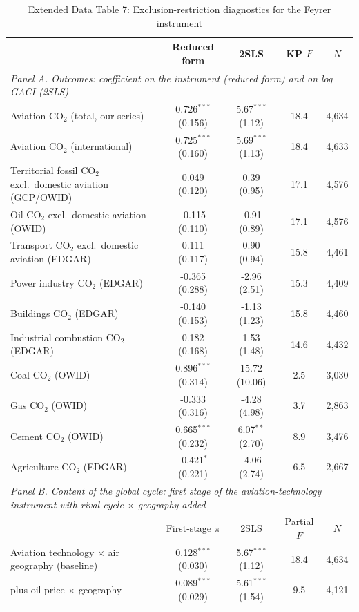 \documentclass[12pt]{article}
\begin{document}
\begin{table}[htbp]
\centering
\begin{threeparttable}
\caption{Extended Data Table 7: Exclusion-restriction diagnostics for the Feyrer instrument}
\label{tab:exclusion}
\scriptsize
\begin{tabular}{lcccc}
\toprule
 & Reduced form & 2SLS & KP $F$ & $N$ \\
\midrule
\multicolumn{5}{l}{\textit{Panel A. Outcomes: coefficient on the instrument (reduced form) and on log GACI (2SLS)}} \\
  Aviation CO$_2$ (total, our series) & 0.726$^{***}$ (0.156) & 5.67$^{***}$ (1.12) & 18.4 & 4,634 \\
  Aviation CO$_2$ (international) & 0.725$^{***}$ (0.160) & 5.69$^{***}$ (1.13) & 18.4 & 4,633 \\
  Territorial fossil CO$_2$ excl.\ domestic aviation (GCP/OWID) & 0.049 (0.120) & 0.39 (0.95) & 17.1 & 4,576 \\
  Oil CO$_2$ excl.\ domestic aviation (OWID) & -0.115 (0.110) & -0.91 (0.89) & 17.1 & 4,576 \\
  Transport CO$_2$ excl.\ domestic aviation (EDGAR) & 0.111 (0.117) & 0.90 (0.94) & 15.8 & 4,461 \\
  Power industry CO$_2$ (EDGAR) & -0.365 (0.288) & -2.96 (2.51) & 15.3 & 4,409 \\
  Buildings CO$_2$ (EDGAR) & -0.140 (0.153) & -1.13 (1.23) & 15.8 & 4,460 \\
  Industrial combustion CO$_2$ (EDGAR) & 0.182 (0.168) & 1.53 (1.48) & 14.6 & 4,432 \\
  Coal CO$_2$ (OWID) & 0.896$^{***}$ (0.314) & 15.72 (10.06) & 2.5 & 3,030 \\
  Gas CO$_2$ (OWID) & -0.333 (0.316) & -4.28 (4.98) & 3.7 & 2,863 \\
  Cement CO$_2$ (OWID) & 0.665$^{***}$ (0.232) & 6.07$^{**}$ (2.70) & 8.9 & 3,476 \\
  Agriculture CO$_2$ (EDGAR) & -0.421$^{*}$ (0.221) & -4.06 (2.74) & 6.5 & 2,667 \\
\midrule
\multicolumn{5}{l}{\textit{Panel B. Content of the global cycle: first stage of the aviation-technology instrument with rival cycle $\times$ geography added}} \\
 & First-stage $\pi$ & 2SLS & Partial $F$ & $N$ \\
  Aviation technology $\times$ air geography (baseline) & 0.128$^{***}$ (0.030) & 5.67$^{***}$ (1.12) & 18.4 & 4,634 \\
  \quad plus oil price $\times$ geography & 0.089$^{***}$ (0.029) & 5.61$^{***}$ (1.54) & 9.5 & 4,121 \\

\end{tabular}
\end{threeparttable}
\end{table}
\end{document}
